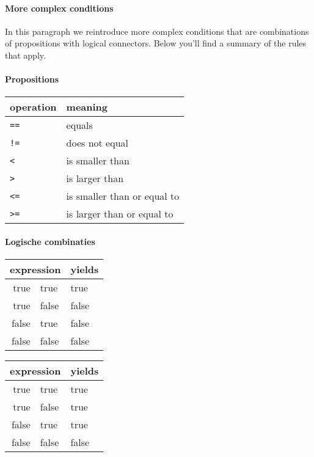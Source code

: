 \paragraph{More complex conditions}

In this paragraph we reintroduce more complex conditions that are combinations of propositions with logical connectors. Below you'll find a summary of the rules that apply.

\paragraph{Propositions}
\begin{center}
\begin{tabular}{ll}
\textbf{operation} &        \textbf{meaning}\\
\midrule
      \texttt{==} &               equals\\
      \texttt{!=} &          does not equal\\
       \texttt{<} &              is smaller than\\
       \texttt{>} &               is larger than\\
      \texttt{<=} &  is smaller than or equal to\\
      \texttt{>=} &  is larger than or equal to\\
\midrule
\end{tabular}
\end{center}

\paragraph{Logische combinaties}
\begin{center}
  \ttfamily
  \begin{tabular}{r@{ \&\& }l@{\qquad}l}
    \multicolumn{2}{l}{\normalfont expression} & {\normalfont yields} \\
    \midrule
    true & true   & true \\
    true & false & false \\
    false & true  & false \\
    false & false  & false \\
    \midrule
  \end{tabular}
  \qquad
  \begin{tabular}{r@{ || }l@{\qquad}l}
    \multicolumn{2}{l}{\normalfont expression} & {\normalfont yields} \\
    \midrule
    true  & true   & true \\
    true  & false  & true \\
    false & true   & true \\
    false & false  & false \\
    \midrule
  \end{tabular}
\end{center}

